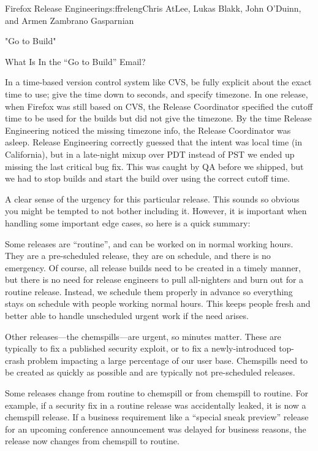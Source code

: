 \begin{aosachapter}{Firefox Release Engineering}{s:ffreleng}{Chris AtLee, Lukas Blakk, John O'Duinn, and Armen Zambrano Gasparnian}
\begin{aosasect1}{"Go to Build"}
\begin{aosasect2}{What Is In the ``Go to Build'' Email?}
\begin{aosaenumerate}
\begin{aosaenumerate2}
    \item In a time-based version control system like CVS, be fully
      explicit about the exact time to use; give the time down to seconds,
      and specify timezone. In one release, when Firefox was still
      based on CVS, the Release Coordinator specified the cutoff time
      to be used for the builds but did not give the timezone. By the
      time Release Engineering noticed the missing timezone info, the
      Release Coordinator was asleep. Release
      Engineering correctly guessed that the intent was local time (in
      California), but in a late-night mixup over PDT instead of PST
      we ended up missing the last critical bug fix. This was caught
      by QA before we shipped, but we had to stop builds and
      start the build over using the correct cutoff time.

    \end{aosaenumerate2}

\item A clear sense of the urgency for this particular release.  This
  sounds so obvious you might be tempted to not bother including
  it. However, it is important when handling some important edge
  cases, so here is a quick summary:

  \begin{aosaenumerate2}

    \item Some releases are ``routine'', and can be worked on in
      normal working hours. They are a pre-scheduled release, they are
      on schedule, and there is no emergency. Of course, all release
      builds need to be created in a timely manner, but there is no
      need for release engineers to pull all-nighters and burn out
      for a routine release.  Instead, we schedule them
      properly in advance so everything stays on schedule with people
      working normal hours. This keeps people fresh and better able to
      handle unscheduled urgent work if the need arises.

    \item Other releases---the chemspills---are urgent, so minutes matter. These are
      typically to fix a published security exploit, or to fix a
      newly-introduced top-crash problem impacting a large percentage
      of our user base. Chemspills need to be created as
      quickly as possible and are typically not pre-scheduled
      releases.

    \item Some releases change from routine to chemspill or
      from chemspill to routine. For example, if a security
      fix in a routine release was accidentally leaked, it is now
      a chemspill release. If a business requirement like a
      ``special sneak preview'' release for an upcoming
      conference announcement was delayed for business
      reasons, the release now changes from chemspill to
      routine.


\end{aosaenumerate2}
\end{aosaenumerate}
\end{aosasect2}
\end{aosasect1}
\end{aosachapter}
